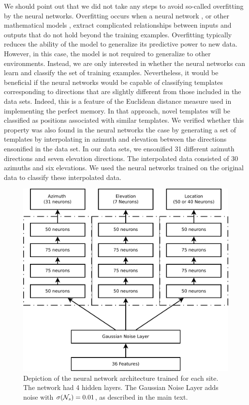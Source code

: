 \documentclass[preprint,5p]{elsarticle}
\begin{document}
We should point out that we did not take any steps to avoid so-called overfitting by the neural networks. Overfitting occurs when a neural network \citep{Ghotra2017}, or other mathematical models \citep{Hawkins2004}, extract complicated relationships between inputs and outputs that do not hold beyond the training examples. Overfitting typically reduces the ability of the model to generalize its predictive power to new data. However, in this case, the model is not required to generalize to other environments. Instead, we are only interested in whether the neural networks can learn and classify the set of training examples. Nevertheless, it would be beneficial if the neural networks would be capable of classifying templates corresponding to directions that are slightly different from those included in the data sets. Indeed, this is a feature of the Euclidean distance measure used in implementing the perfect memory. In that approach, novel templates will be classified as positions associated with similar templates. We verified whether this property was also found in the neural networks the case by generating a set of templates by interpolating in azimuth and elevation between the directions ensonified in the data set. In our data sets, we ensonified 31 different azimuth directions and seven elevation directions. The interpolated data consisted of 30 azimuths and six elevations. We used the neural networks trained on the original data to classify these interpolated data. 

\begin{figure}
	\centering
	\includegraphics[width=1\linewidth]{figures/networks}
	\caption{Depiction of the neural network architecture trained for each site. The network had 4 hidden layers. The Gaussian Noise Layer adds noise with $\sigma(\mathcal{N}_s) = 0.01$, as described in the main text.}
	\label{fig:networks}
\end{figure}
\end{document}
